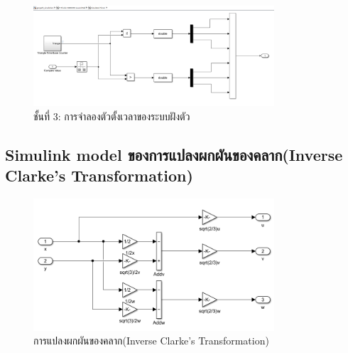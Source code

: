 \documentclass[11pt,a4paper]{article}
\begin{document}
\begin{figure}[H]
    \centering
    \includegraphics[width=0.8\textwidth]{l3-sim-tim.png}
    \caption{ชั้นที่ 3: การจำลองตัวตั้งเวลาของระบบฝังตัว}
\end{figure}

\subsection{Simulink model ของการแปลงผกผันของคลาก(Inverse Clarke's Transformation)}
\begin{figure}[H]
    \centering
    \includegraphics[width=0.8\textwidth]{inverse_clarke.png}
    \caption{การแปลงผกผันของคลาก(Inverse Clarke's Transformation)}
\end{figure}
\end{document}
